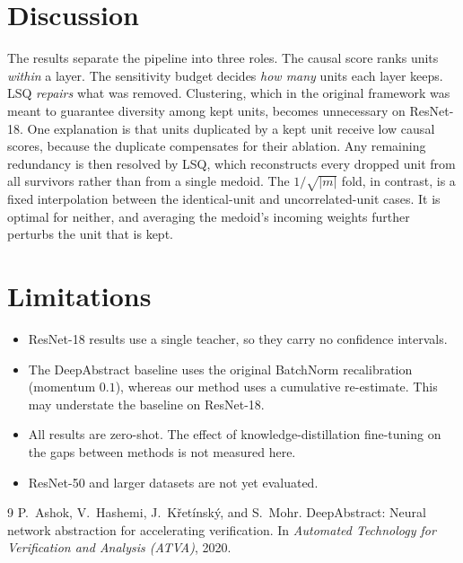 \documentclass[11pt]{article}
\begin{document}
\section{Discussion}
The results separate the pipeline into three roles. The causal score ranks units \emph{within} a layer.
The sensitivity budget decides \emph{how many} units each layer keeps. LSQ \emph{repairs} what was
removed. Clustering, which in the original framework was meant to guarantee diversity among kept units,
becomes unnecessary on ResNet-18. One explanation is that units duplicated by a kept unit receive low
causal scores, because the duplicate compensates for their ablation. Any remaining redundancy is then
resolved by LSQ, which reconstructs every dropped unit from all survivors rather than from a single
medoid. The $1/\sqrt{|m|}$ fold, in contrast, is a fixed interpolation between the identical-unit and
uncorrelated-unit cases. It is optimal for neither, and averaging the medoid's incoming weights further
perturbs the unit that is kept.

\section{Limitations}
\begin{itemize}
  \item ResNet-18 results use a single teacher, so they carry no confidence intervals.
  \item The DeepAbstract baseline uses the original BatchNorm recalibration (momentum $0.1$), whereas our
        method uses a cumulative re-estimate. This may understate the baseline on ResNet-18.
  \item All results are zero-shot. The effect of knowledge-distillation fine-tuning on the gaps between
        methods is not measured here.
  \item ResNet-50 and larger datasets are not yet evaluated.
\end{itemize}

\begin{thebibliography}{9}
P.~Ashok, V.~Hashemi, J.~K\v{r}et\'{i}nsk\'{y}, and S.~Mohr.
\newblock DeepAbstract: Neural network abstraction for accelerating verification.
\newblock In \emph{Automated Technology for Verification and Analysis (ATVA)}, 2020.
\end{thebibliography}
\end{document}
